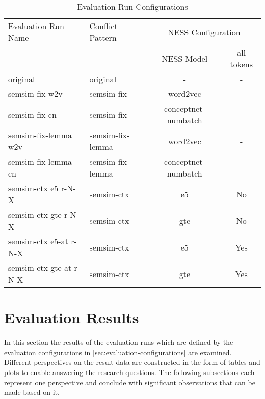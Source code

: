 \documentclass[11pt]{scrreprt}
\begin{document}
\begin{table}
\centering
\begin{tabular}{llcc}
\toprule
\multicolumn{1}{l}{Evaluation Run Name} & \multicolumn{1}{l}{Conflict Pattern} & \multicolumn{2}{c}{NESS Configuration} \\
\cmidrule{3-4}
\multicolumn{1}{l}{}   & \multicolumn{1}{l}{}  & \multicolumn{1}{c}{NESS Model}	& \multicolumn{1}{c}{all tokens} \\
\midrule
original                       & original                     & -                          & -                \\
semsim-fix w2v                 & semsim-fix                   & word2vec                   & -                \\
semsim-fix cn                 & semsim-fix                   & conceptnet-numbatch                      & -      \\
semsim-fix-lemma w2v           & semsim-fix-lemma             & word2vec                   & -                \\
semsim-fix-lemma cn           & semsim-fix-lemma             & conceptnet-numbatch                      & -      \\
semsim-ctx e5 r-N-X                & semsim-ctx                   & e5                         & No           \\
semsim-ctx gte r-N-X              & semsim-ctx                   & gte                        & No            \\
semsim-ctx e5-at r-N-X             & semsim-ctx                   & e5                         & Yes          \\
semsim-ctx gte-at r-N-X           & semsim-ctx                   & gte                        & Yes           \\
\end{tabular}
\caption{Evaluation Run Configurations}
\label{tab:evaluation-run-configs}
\end{table}


\section{Evaluation Results}
\label{sec:evaluation-results}
In this section the results of the evaluation runs which are defined by the evaluation configurations in \cref{sec:evaluation-configurations} are examined. Different perspectives on the result data are constructed in the form of tables and plots to enable answering the research questions. The following subsections each represent one perspective and conclude with significant observations that can be made based on it.
\end{document}
